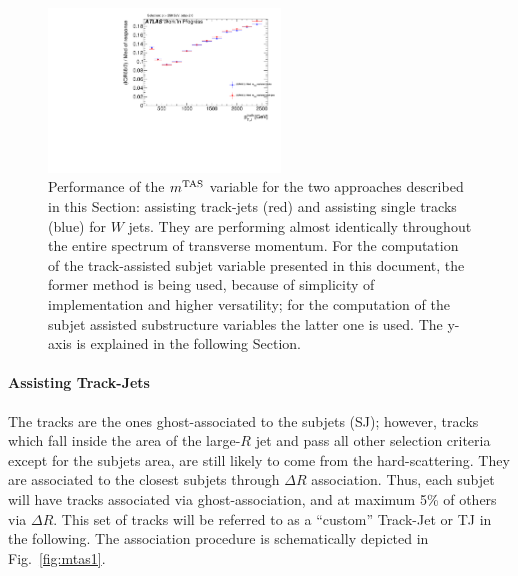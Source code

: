 \begin{figure}[!ht]
  \centering
      \includegraphics[width=0.55\textwidth]{jet_part/71graphcftr_h_JetRatio_mJ12CALOIQRoMwsecondApproach.pdf}
  \caption[Equivalence of approaches]{Performance of the $m^\textrm{TAS}$ variable for the two approaches described in this Section: assisting track-jets (red) and assisting single tracks (blue) for $W$ jets. They are performing almost identically throughout the entire spectrum of transverse momentum. For the computation of the track-assisted subjet variable presented in this document, the former method is being used, because of simplicity of implementation and higher versatility; for the computation of the subjet assisted substructure variables the latter one is used. The y-axis is explained in the following Section.}
  \label{fig:sascha}
\end{figure}


\paragraph{Assisting Track-Jets}
The tracks are the ones ghost-associated to the subjets (SJ); however, tracks which fall inside the area of the large-$R$ jet and pass all other selection criteria except for the subjets area, are still likely to come from the hard-scattering. They are associated to the closest subjets through $\Delta R$ association. Thus, each subjet will have tracks associated via ghost-association, and at maximum 5\% of others via $\Delta R$. This set of tracks will be referred to as a ``custom'' Track-Jet or TJ in the following. The association procedure is schematically depicted in Fig.~\ref{fig:mtas1}.

